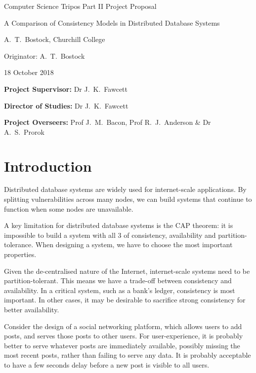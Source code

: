\setlength{\parindent}{0em}
\addtolength{\parskip}{1ex}

\vfil

\centerline{\Large Computer Science Tripos Part II Project Proposal}
\vspace{0.4in}
\centerline{\Large A Comparison of Consistency Models in Distributed Database Systems}
\vspace{0.4in}
\centerline{\large A.~T.~Bostock, Churchill College}
\vspace{0.3in}
\centerline{\large Originator: A.~T.~Bostock }
\vspace{0.3in}
\centerline{\large 18 October 2018}

\vfil

\vspace{0.2in}

\noindent
{\bf Project Supervisor:} Dr J.~K.~Fawcett
\vspace{0.2in}

\noindent
{\bf Director of Studies:} Dr J.~K.~Fawcett
\vspace{0.2in}
\noindent
 
\noindent
{\bf Project Overseers:} Prof J.~M.~Bacon, Prof R.~J.~Anderson \& Dr A.~S.~Prorok

\vfil
\pagebreak


\section*{Introduction}

Distributed database systems are widely used for internet-scale applications. By splitting vulnerabilities across many nodes, we can build systems that continue to function when some nodes are unavailable.

A key limitation for distributed database systems is the CAP theorem: it is impossible to build a system with all 3 of consistency, availability and partition-tolerance. When designing a system, we have to choose the most important properties.

Given the de-centralised nature of the Internet, internet-scale systems need to be partition-tolerant. This means we have a trade-off between consistency and availability. In a critical system, such as a bank's ledger, consistency is most important. In other cases, it may be desirable to sacrifice strong consistency for better availability.

Consider the design of a social networking platform, which allows users to add posts, and serves those posts to other users. For user-experience, it is probably better to serve whatever posts are immediately available, possibly missing the most recent posts, rather than failing to serve any data. It is probably acceptable to have a few seconds delay before a new post is visible to all users.

